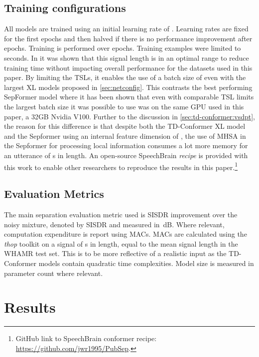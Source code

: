 \subsection{Training configurations}
All models are trained using an initial learning rate of . Learning rates are fixed for the first  epochs and then halved if there is no performance improvement after  epochs. Training is performed over  epochs. Training examples were limited to  seconds. In \cite{tsllimits} it was shown that this signal length is in an optimal range to reduce training time without impacting overall performance for the datasets used in this paper. By limiting the \acp{TSL}, it enables the use of a batch size of  even with the largest XL models proposed in \autoref{sec:netconfig}. This contrasts the best performing SepFormer model where it has been shown that even with comparable \ac{TSL} limits the largest batch size it was possible to use was  \cite{tsllimits} on the same GPU used in this paper, a 32GB Nvidia V100. Further to the discussion in \autoref{sec:td-conformer:vsdpt}, the reason for this difference is that despite both the TD-Conformer XL model and the Sepformer using an internal feature dimension of , the use of \ac{MHSA} in the Sepformer for processing local information consumes a lot more memory for an utterance of s in length.
An open-source SpeechBrain \cite{speechbrain} \emph{recipe} is provided with this work to enable other researchers to reproduce the results in this paper.\footnote{GitHub link to SpeechBrain conformer recipe: \url{https://github.com/jwr1995/PubSep}.}

\subsection{Evaluation Metrics}
The main separation evaluation metric used is \ac{SISDR} improvement over the noisy mixture, denoted by  \ac{SISDR} and measured in~dB. Where relevant, computation expenditure is report using \ac{MACs}. \Ac{MACs} are calculated using the \textit{thop} \cite{thop} toolkit on a signal of s in length, equal to the mean signal length in the WHAMR test set. This is to be more reflective of a realistic input as the TD-Conformer models contain quadratic time complexities. Model size is measured in parameter count where relevant.


\section{Results}\label{sec:results}

